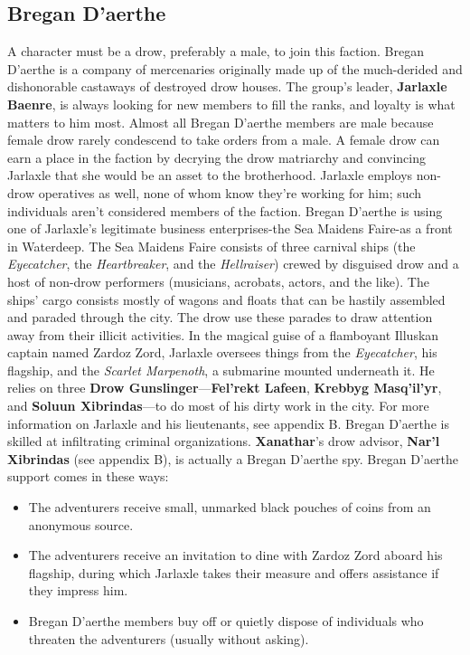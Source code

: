 \documentclass[10pt,a4paper,twoside,twocolumn,openany,nodeprecatedcode]{dndbook}
\begin{document}
\subsection{Bregan D'aerthe}
A character must be a drow, preferably a male, to join this faction.
Bregan D'aerthe is a company of mercenaries originally made up of the much-derided and dishonorable castaways of destroyed drow houses. The group's leader, \textbf{Jarlaxle Baenre}, is always looking for new members to fill the ranks, and loyalty is what matters to him most.
Almost all Bregan D'aerthe members are male because female drow rarely condescend to take orders from a male. A female drow can earn a place in the faction by decrying the drow matriarchy and convincing Jarlaxle that she would be an asset to the brotherhood. Jarlaxle employs non-drow operatives as well, none of whom know they're working for him; such individuals aren't considered members of the faction.
Bregan D'aerthe is using one of Jarlaxle's legitimate business enterprises-the Sea Maidens Faire-as a front in Waterdeep. The Sea Maidens Faire consists of three carnival ships (the \textit{Eyecatcher}, the \textit{Heartbreaker}, and the \textit{Hellraiser}) crewed by disguised drow and a host of non-drow performers (musicians, acrobats, actors, and the like). The ships' cargo consists mostly of wagons and floats that can be hastily assembled and paraded through the city. The drow use these parades to draw attention away from their illicit activities.
In the magical guise of a flamboyant Illuskan captain named Zardoz Zord, Jarlaxle oversees things from the \textit{Eyecatcher}, his flagship, and the \textit{Scarlet Marpenoth}, a submarine mounted underneath it. He relies on three \textbf{Drow Gunslinger}—\textbf{Fel'rekt Lafeen}, \textbf{Krebbyg Masq'il'yr}, and \textbf{Soluun Xibrindas}—to do most of his dirty work in the city. For more information on Jarlaxle and his lieutenants, see appendix B.
Bregan D'aerthe is skilled at infiltrating criminal organizations. \textbf{Xanathar}'s drow advisor, \textbf{Nar'l Xibrindas} (see appendix B), is actually a Bregan D'aerthe spy. Bregan D'aerthe support comes in these ways:
\begin{itemize}

\item The adventurers receive small, unmarked black pouches of coins from an anonymous source.
\item The adventurers receive an invitation to dine with Zardoz Zord aboard his flagship, during which Jarlaxle takes their measure and offers assistance if they impress him.
\item Bregan D'aerthe members buy off or quietly dispose of individuals who threaten the adventurers (usually without asking).
\end{itemize}
\end{document}
